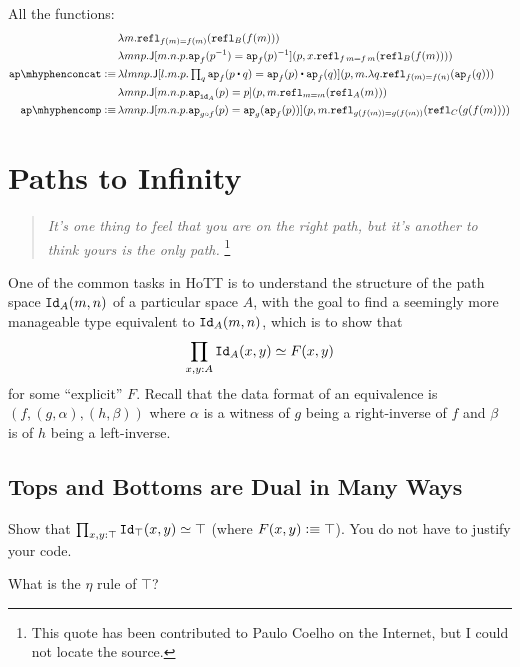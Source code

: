\documentclass[12pt]{article}
\newcommand{\cut}[1]{}
\newcommand{\marksolution}[1]{\color{FireBrick}#1\normalcolor}%
\newcommand{\marksolution}[1]{\cut{#1}}%
\newenvironment{solution}{\trivlist \item[\hskip \labelsep{\bf
Solution:}]}{\endtrivlist}
\begin{document}
\marksolution{
\begin{solution}
  All the functions:
  \begin{align*}
    &\,
    \lambda m.\refl_{f(m)=f(m)}(\refl_B(f(m)))
    \\
    &\,
    \lambda mnp. \J[m.n.p.\ap_f(p^{-1}) = \ap_f(p)^{-1}](p, x.\refl_{f\,m=f\,m}(\refl_B(f(m))))
    \\
    \apconcat
    \defeq
    &\,
    \textstyle
    \lambda lmnp. \J[l.m.p.\prod_q\ap_f(p \concat q) = \ap_f(p) \concat \ap_f(q)](p,
    m.\lambda q.\refl_{f(m)=f(n)}(\ap_f(q)))
    \\
    &\,
    \lambda mnp.\J[m.n.p.\ap_{\id_A}(p) = p](p, m.\refl_{m=m}(\refl_A(m)))
    \\
    \apcomp
    \defeq
    &\,
    \lambda mnp.\J[m.n.p.\ap_{g \comp f}(p) = \ap_g(\ap_f(p))](p, m.\refl_{g(f(m))=g(f(m))}(\refl_C(g(f(m))))
  \end{align*}
\end{solution}
}

\section{Paths to Infinity}
\begin{verse}
  \textit{It's one thing to feel that you are on the right path, but it's another to think yours is the only path.}%
  \footnote{This quote has been contributed to Paulo Coelho on the Internet, but I could not locate the source.}
\end{verse}

One of the common tasks in HoTT is to
understand the structure of the path space $\mathtt{Id}_A(m,n)$
of a particular space $A$,
with the goal to find a seemingly more manageable type equivalent to $\mathtt{Id}_A(m,n)$,
which is to show that
\[
  \prod_{x,y:A} \mathtt{Id}_A(x,y) \simeq F(x,y)
\]
for some ``explicit'' $F$.
Recall that the data format of an equivalence is
$(f,(g,\alpha),(h,\beta))$
where $\alpha$ is a witness of $g$ being a right-inverse of $f$
and $\beta$ is of $h$ being a left-inverse.

\subsection{Tops and Bottoms are Dual in Many Ways}

\begin{task}
  Show that $\prod_{x,y:\top} \mathtt{Id}_\top(x,y) \simeq \top$
  (where $F(x,y) \vcentcolon\equiv \top$).
  You do not have to justify your code.
  \begin{hint}
    What is the $\eta$ rule of $\top$?
  \end{hint}
\end{task}
\end{document}

